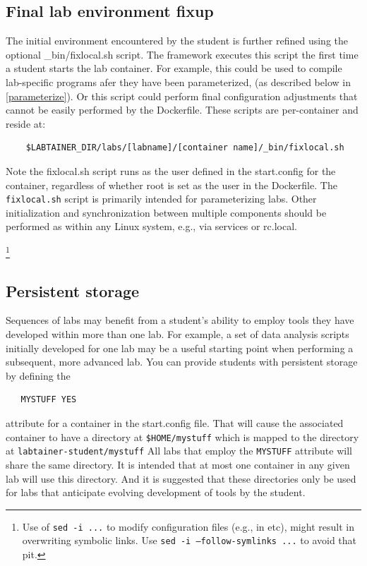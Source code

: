 \documentclass[12pt]{article}
\begin{document}
\subsection{Final lab environment fixup}
The initial environment encountered by the student is further refined using
the optional \_bin/fixlocal.sh script.  The framework executes
this script the first time a student starts the lab container.  For example,
this could be used to compile lab-specific programs afer they have been parameterized,
(as described below in \ref{parameterize}).  Or this script could perform final configuration adjustments
that cannot be easily performed by the Dockerfile.  These scripts are per-container
and reside at:
\begin{verbatim}
    $LABTAINER_DIR/labs/[labname]/[container name]/_bin/fixlocal.sh
\end{verbatim}
\noindent Note the fixlocal.sh script runs as the user defined in the start.config for the container, 
regardless of whether root is set as the user in the Dockerfile.  The {\tt fixlocal.sh} script is primarily
intended for parameterizing labs.  Other initialization and synchronization between multiple components 
should be performed as within any Linux system, e.g., via services or rc.local.


\footnote{Use of {\tt sed -i ...} to modify configuration files (e.g., in etc), might result in overwriting symbolic links.
Use {\tt sed -i --follow-symlinks ...} to avoid that pit.}

\subsection{Persistent storage}
\label{persistent}
Sequences of labs may benefit from a student's ability to employ tools they have developed within more than one lab.
For example, a set of data analysis scripts initially developed for one lab may be a useful starting point when
performing a subsequent, more advanced lab.  You can provide students with persistent storage by defining the
\begin{verbatim}
   MYSTUFF YES
\end{verbatim}
\noindent attribute for a container in the start.config file.  That will cause the associated container to have
a directory at {\tt \$HOME/mystuff} which is mapped to the directory at {\tt labtainer-student/mystuff}
All labs that employ the {\tt MYSTUFF} attribute will share the same directory.  It is intended that at most one
container in any given lab will use this directory.  And it is suggested that these directories only be used for
labs that anticipate evolving development of tools by the student.  
\end{document}
